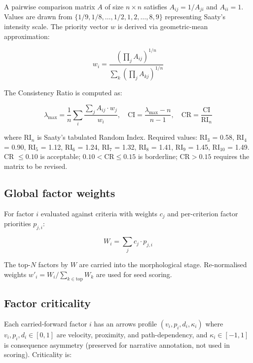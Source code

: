 \documentclass[11pt,a4paper]{article}
\begin{document}
A pairwise comparison matrix $A$ of size $n \times n$ satisfies $A_{ij} = 1/A_{ji}$ and $A_{ii} = 1$. Values are drawn from $\{1/9, 1/8, \ldots, 1/2, 1, 2, \ldots, 8, 9\}$ representing Saaty's intensity scale. The priority vector $w$ is derived via geometric-mean approximation:

\begin{equation}
w_i = \frac{\left(\prod_j A_{ij}\right)^{1/n}}{\sum_k \left(\prod_j A_{kj}\right)^{1/n}}
\end{equation}

The Consistency Ratio is computed as:

\begin{equation}
\lambda_{\max} = \frac{1}{n} \sum_i \frac{\sum_j A_{ij} \cdot w_j}{w_i}, \quad \text{CI} = \frac{\lambda_{\max} - n}{n - 1}, \quad \text{CR} = \frac{\text{CI}}{\text{RI}_n}
\end{equation}

where $\text{RI}_n$ is Saaty's tabulated Random Index. Required values: RI$_3$ = 0.58, RI$_4$ = 0.90, RI$_5$ = 1.12, RI$_6$ = 1.24, RI$_7$ = 1.32, RI$_8$ = 1.41, RI$_9$ = 1.45, RI$_{10}$ = 1.49. CR $\le 0.10$ is acceptable; $0.10 < \text{CR} \le 0.15$ is borderline; $\text{CR} > 0.15$ requires the matrix to be revised.

\subsection{Global factor weights}

For factor $i$ evaluated against criteria with weights $c_j$ and per-criterion factor priorities $p_{j,i}$:

\begin{equation}
W_i = \sum_j c_j \cdot p_{j,i}
\end{equation}

The top-$N$ factors by $W$ are carried into the morphological stage. Re-normalised weights $w'_i = W_i / \sum_{k \in \text{top}} W_k$ are used for seed scoring.

\subsection{Factor criticality}

Each carried-forward factor $i$ has an arrows profile $(v_i, p_i, d_i, \kappa_i)$ where $v_i, p_i, d_i \in [0, 1]$ are velocity, proximity, and path-dependency, and $\kappa_i \in [-1, 1]$ is consequence asymmetry (preserved for narrative annotation, not used in scoring). Criticality is:
\end{document}
